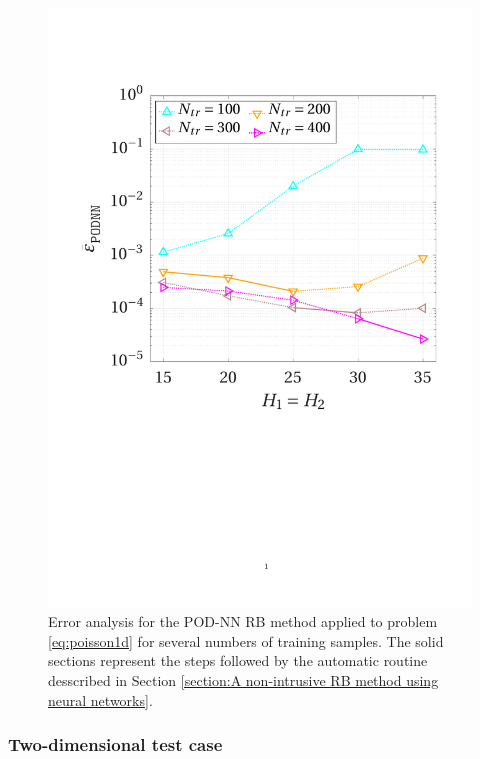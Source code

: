 \documentclass{elsarticle}
\numberwithin{equation}{section}
\theoremstyle{theorem}
\theoremstyle{definition}
\theoremstyle{remark}
\theoremstyle{proposition}
\numberwithin{figure}{section}
\begin{document}
		\begin{figure}[t!]
			\center
			\includegraphics[scale = 0.4, trim = {1cm 9cm 1.5cm 3.5cm}, clip]{poisson1d_3_nn_convergence}
			
			\caption{Error analysis for the POD-NN RB method applied to problem \eqref{eq:poisson1d} for several numbers of training samples. The solid sections represent the steps followed by the automatic routine desscribed in Section \ref{section:A non-intrusive RB method using neural networks}.}
			\label{fig:poisson1d-fig3}
		\end{figure}
		
		
	
	\subsubsection{Two-dimensional test case}
	\label{section:Two-dimensional test case}
		
\end{document}
